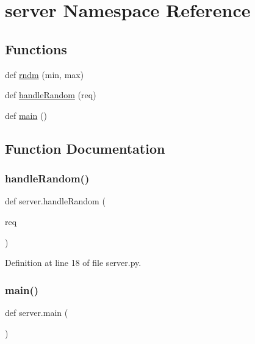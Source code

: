 \hypertarget{namespaceserver}{}\section{server Namespace Reference}
\label{namespaceserver}
\subsection*{Functions}
\begin{DoxyCompactItemize}
\item 
def \hyperlink{namespaceserver_a3b3450e25776d7cb706ea4f6abf78ace}{rndm} (min, max)
\item 
def \hyperlink{namespaceserver_a963f1a576759e0c953a3181fbba2ed26}{handle\+Random} (req)
\item 
def \hyperlink{namespaceserver_a6d1c10ed8aa5d27e61ed9db6b4274261}{main} ()
\end{DoxyCompactItemize}


\subsection{Function Documentation}
\mbox{\label{namespaceserver_a963f1a576759e0c953a3181fbba2ed26}} 
\subsubsection{\texorpdfstring{handle\+Random()}{handleRandom()}}
{\footnotesize\ttfamily def server.\+handle\+Random (\begin{DoxyParamCaption}\item[{}]{req }\end{DoxyParamCaption})}



Definition at line 18 of file server.\+py.

\mbox{\label{namespaceserver_a6d1c10ed8aa5d27e61ed9db6b4274261}} 
\subsubsection{\texorpdfstring{main()}{main()}}
{\footnotesize\ttfamily def server.\+main (\begin{DoxyParamCaption}{ }\end{DoxyParamCaption})}



